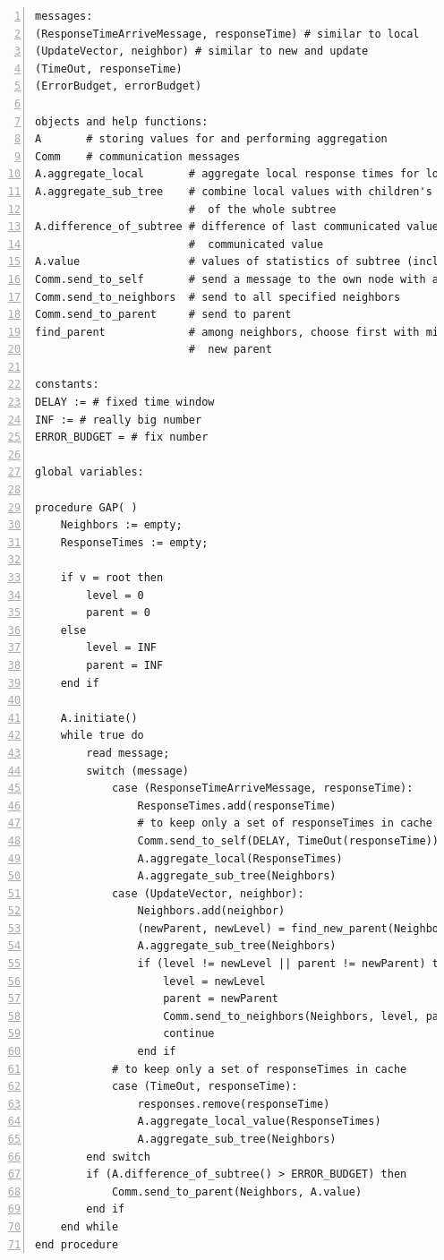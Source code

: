 \documentclass[a4paper, smallheadings,english]{scrartcl}
\begin{document}
\begin{lstlisting}[caption={Pseudocode for $\widetilde{f}(t)$ with error budget in $P_1$}, label={lst:2}, numbers=left, frame=single]
messages:
(ResponseTimeArriveMessage, responseTime) # similar to local
(UpdateVector, neighbor) # similar to new and update
(TimeOut, responseTime)
(ErrorBudget, errorBudget)

objects and help functions:
A       # storing values for and performing aggregation
Comm    # communication messages
A.aggregate_local       # aggregate local response times for local statistics
A.aggregate_sub_tree    # combine local values with children's for statistics
                        #  of the whole subtree
A.difference_of_subtree # difference of last communicated value versus current
                        #  communicated value
A.value                 # values of statistics of subtree (including own)
Comm.send_to_self       # send a message to the own node with a delay
Comm.send_to_neighbors  # send to all specified neighbors
Comm.send_to_parent     # send to parent
find_parent             # among neighbors, choose first with minimum level as
                        #  new parent

constants:
DELAY := # fixed time window
INF := # really big number
ERROR_BUDGET = # fix number

global variables:

procedure GAP( )
    Neighbors := empty;
    ResponseTimes := empty;

    if v = root then
        level = 0
        parent = 0
    else
        level = INF
        parent = INF
    end if

    A.initiate()
    while true do
        read message;
        switch (message)
            case (ResponseTimeArriveMessage, responseTime):
                ResponseTimes.add(responseTime)
                # to keep only a set of responseTimes in cache
                Comm.send_to_self(DELAY, TimeOut(responseTime))
                A.aggregate_local(ResponseTimes)
                A.aggregate_sub_tree(Neighbors)
            case (UpdateVector, neighbor):
                Neighbors.add(neighbor) 
                (newParent, newLevel) = find_new_parent(Neighbors)
                A.aggregate_sub_tree(Neighbors)
                if (level != newLevel || parent != newParent) then
                    level = newLevel
                    parent = newParent
                    Comm.send_to_neighbors(Neighbors, level, parent, A.value())
                    continue
                end if
            # to keep only a set of responseTimes in cache
            case (TimeOut, responseTime):
                responses.remove(responseTime)
                A.aggregate_local_value(ResponseTimes)
                A.aggregate_sub_tree(Neighbors)
        end switch
        if (A.difference_of_subtree() > ERROR_BUDGET) then
            Comm.send_to_parent(Neighbors, A.value)
        end if
    end while
end procedure
\end{lstlisting}
\end{document}
